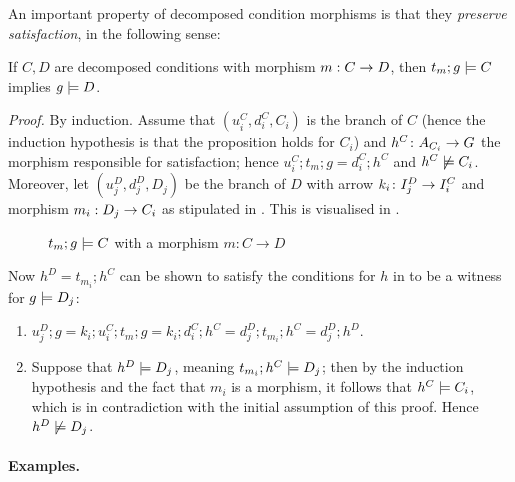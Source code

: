 %
\medskip\noindent An important property of decomposed condition morphisms is that they \emph{preserve satisfaction}, in the following sense:
%
\begin{proposition}
If $C,D$ are decomposed conditions with morphism $m:C\rightarrow D$, then $t_m;g\models C$ implies $g\models D$.
\end{proposition}
%
\emph{Proof.} By induction. Assume that $(u_i^C,d_i^C,C_i)$ is the branch of $C$ (hence the induction hypothesis is that the proposition holds for $C_i$) and $h^C\colon A_{C_i}\rightarrow G$ the morphism responsible for satisfaction; hence $u_i^C;t_m;g=d_i^C;h^C$ and $h^C\not\models C_i$. Moreover, let $(u_j^D,d_j^D,D_j)$ be the branch of $D$ with arrow $k_i\colon I_j^D\rightarrow I_i^C$ and morphism $m_i:D_j\rightarrow C_i$ as stipulated in . This is visualised in .
%
\begin{figure}
  \centering
  
  \caption{$t_m;g\models C$ with a morphism $m:C\rightarrow D$}
\end{figure}

Now $h^D=t_{m_i};h^C$ can be shown to satisfy the conditions for $h$ in  to be a witness for $g\models D_j$:
\begin{enumerate}
\item $u_j^D;g = k_i;u_i^C;t_m;g= k_i;d_i^C;h^C = d_j^D;t_{m_i};h^C=d_j^D;h^D$.
\item Suppose that $h^D\models D_j$, meaning $t_{m_i};h^C\models D_j$; then by the induction hypothesis and the fact that $m_i$ is a morphism, it follows that $h^C\models C_i$, which is in contradiction with the initial assumption of this proof. Hence $h^D\not\models D_j$.
\end{enumerate}
%
\paragraph{Examples.}

